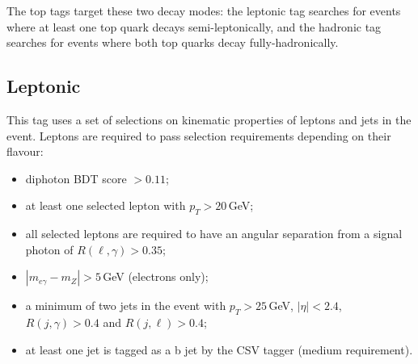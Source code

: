 The top tags target these two decay modes: the leptonic tag searches for \ttH events where at least one top quark decays semi-leptonically, and the hadronic tag searches for \ttH events where both top quarks decay fully-hadronically. 

\subsection{\ttH Leptonic}
This tag uses a set of selections on kinematic properties of leptons and jets in the event. 
Leptons are required to pass selection requirements depending on their flavour:
\begin{itemize}[noitemsep]
    \item diphoton BDT score $> 0.11$;
    \item at least one selected lepton with $p_{T} > 20$\,GeV;
    \item all selected leptons are required to have an angular separation from a signal photon of $R(\ell,\gamma) > 0.35$;
    \item $|m_{e\gamma} - m_{Z}| > 5$\,GeV (electrons only);
    \item a minimum of two jets in the event with $p_{T} > 25$\,GeV, $|\eta| < 2.4$, $R(j,\gamma) > 0.4$ and $R(j,\ell) > 0.4$;
    \item at least one jet is tagged as a b jet by the CSV tagger (medium requirement).
\end{itemize}


